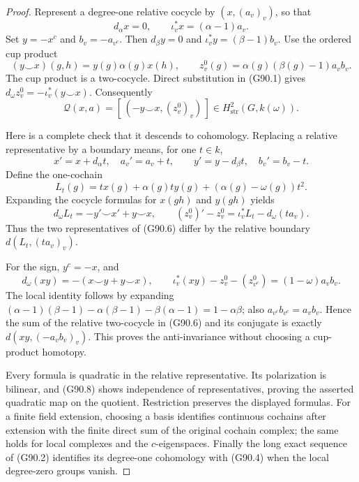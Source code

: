 \begin{proof}
Represent a degree-one relative cocycle by \((x,(a_v)_v)\), so that
\[
 d_\alpha x=0,\qquad
 \iota_v^*x=(\alpha-1)a_v.
\]
Set \(y=-x^c\) and \(b_v=-a_{v^c}\).  Then \(d_\beta y=0\) and
\(\iota_v^*y=(\beta-1)b_v\).
Use the ordered cup product
\[
 (y\smile x)(g,h)=y(g)\alpha(g)x(h),
 \qquad z_v^0(g)=\alpha(g)(\beta(g)-1)a_vb_v.
 \tag{G90.5}
\]
The cup product is a two-cocycle.  Direct substitution in (G90.1) gives
\(d_\omega z_v^0=-\iota_v^*(y\smile x)\).  Consequently
\[
 \mathcal Q(x,a)=
       [\,(-y\smile x,(z_v^0)_v)\,]
       \in H^2_{\mathrm{str}}(G,k(\omega)).
 \tag{G90.6}
\]

Here is a complete check that it descends to cohomology.  Replacing a
relative representative by a boundary means, for one \(t\in k\),
\[
 x'=x+d_\alpha t,\quad a_v'=a_v+t,\qquad
 y'=y-d_\beta t,\quad b_v'=b_v-t.
\]
Define the one-cochain
\[
 L_t(g)=t x(g)+\alpha(g)t y(g)
               +(\alpha(g)-\omega(g))t^2.
 \tag{G90.7}
\]
Expanding the cocycle formulas for \(x(gh)\) and \(y(gh)\) yields
\[
 d_\omega L_t=-y'\smile x'+y\smile x,\qquad
 (z_v^0)'-z_v^0=\iota_v^*L_t-d_\omega(t a_v).
 \tag{G90.8}
\]
Thus the two representatives of (G90.6) differ by the relative
boundary \(d(L_t,(t a_v)_v)\).

For the sign, \(y^c=-x\), and
\[
 d_\omega(xy)=-(x\smile y+y\smile x),\qquad
 \iota_v^*(xy)-z_v^0-(z_{v^c}^0)
                      =(1-\omega)a_vb_v.
 \tag{G90.9}
\]
The local identity follows by expanding
\((\alpha-1)(\beta-1)-\alpha(\beta-1)-\beta(\alpha-1)=1-\alpha\beta\);
also \(a_{v^c}b_{v^c}=a_vb_v\).
Hence the sum of the relative two-cocycle in (G90.6) and its conjugate is
exactly \(d(xy,(-a_vb_v)_v)\).  This proves the anti-invariance without
choosing a cup-product homotopy.

Every formula is quadratic in the relative representative.  Its
polarization is bilinear, and (G90.8) shows independence of
representatives, proving the asserted quadratic map on the quotient.
Restriction preserves the displayed formulas.  For a finite field
extension, choosing a basis identifies continuous cochains after
extension with the finite direct sum of the original cochain complex;
the same holds for local complexes and the \(c\)-eigenspaces.
Finally the long exact sequence of (G90.2) identifies its degree-one
cohomology with (G90.4) when the local degree-zero groups vanish.
\end{proof}

